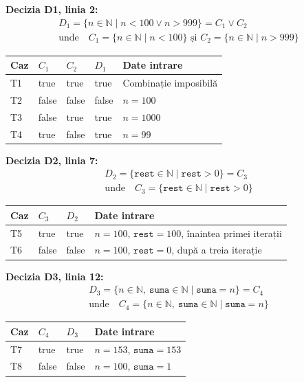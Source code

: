 \documentclass[11pt,a4paper]{article}
\begin{document}
\textbf{Decizia D1, linia 2:}
\[
\begin{gathered}
D_1=\{n\in\mathbb{N}\mid n<100\lor n>999\}=C_1\lor C_2
\\[2pt]
\text{unde}\quad C_1=\{n\in\mathbb{N}\mid n<100\}\text{ și }C_2=\{n\in\mathbb{N}\mid n>999\}
\end{gathered}
\]

\begin{center}
\begin{tabular}{@{}lllll@{}}
\toprule
Caz & $C_1$ & $C_2$ & $D_1$ & Date intrare \\
\midrule
T1 & true & true & true & Combinație imposibilă \\
T2 & false & false & false & $n=100$ \\
T3 & false & true & true & $n=1000$ \\
T4 & true & false & true & $n=99$ \\
\bottomrule
\end{tabular}
\end{center}

\textbf{Decizia D2, linia 7:}
\[
\begin{gathered}
D_2=\{\texttt{rest}\in\mathbb{N}\mid\texttt{rest}>0\}=C_3
\\[2pt]
\text{unde}\quad C_3=\{\texttt{rest}\in\mathbb{N}\mid\texttt{rest}>0\}
\end{gathered}
\]

\begin{center}
\begin{tabular}{@{}llll@{}}
\toprule
Caz & $C_3$ & $D_2$ & Date intrare \\
\midrule
T5 & true & true & $n=100$, $\texttt{rest}=100$, înaintea primei iterații \\
T6 & false & false & $n=100$, $\texttt{rest}=0$, după a treia iterație \\
\bottomrule
\end{tabular}
\end{center}


\textbf{Decizia D3, linia 12:}
\[
\begin{gathered}
D_3=\{n\in\mathbb{N},\ \texttt{suma}\in\mathbb{N}\mid\texttt{suma}=n\}=C_4
\\[2pt]
\text{unde}\quad C_4=\{n\in\mathbb{N},\ \texttt{suma}\in\mathbb{N}\mid\texttt{suma}=n\}
\end{gathered}
\]

\begin{center}
\begin{tabular}{@{}llll@{}}
\toprule
Caz & $C_4$ & $D_3$ & Date intrare \\
\midrule
T7 & true & true & $n=153$, $\texttt{suma}=153$ \\
T8 & false & false & $n=100$, $\texttt{suma}=1$ \\
\bottomrule
\end{tabular}
\end{center}
\end{document}
